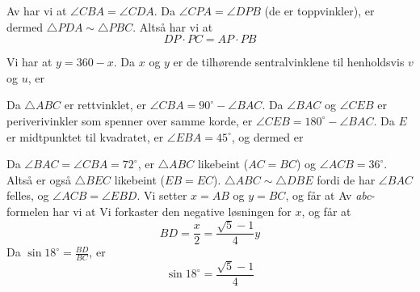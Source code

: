




	\footnotesize
\opgt

Av  har vi at $ \angle CBA=\angle CDA $. Da $ \angle CPA=\angle DPB $ (de er toppvinkler), er dermed $ \triangle PDA \sim \triangle PBC$. Altså har vi at
\[ DP\cdot PC=AP\cdot PB \]

Vi har at $ y=360-x $. Da $ x $ og $ y $ er de tilhørende sentralvinklene til henholdsvis $ v $ og $ u $, er

\newpage
{}
Da $ \triangle ABC $ er rettvinklet, er $ \angle CBA=90^\circ-\angle BAC $. Da $ \angle BAC $ og $ \angle CEB $ er periverivinkler som spenner over samme korde, er $ \angle CEB=180^\circ-\angle BAC $. Da $ E $ er midtpunktet til kvadratet, er $ \angle EBA=45^\circ$, og dermed er

Da $ \angle BAC=\angle CBA=72^\circ $, er $ \triangle ABC $ likebeint ($ AC=BC $) og $ \angle ACB= 36^\circ $. Altså er også $ \triangle BEC $ likebeint ($ EB=EC $). $ \triangle ABC \sim \triangle DBE$ fordi de har $ \angle BAC $ felles, og $ \angle ACB=\angle EBD $. Vi setter $ x=AB $ og $ y=BC $, og får at
Av \textit{abc}-formelen har vi at
Vi forkaster den negative løsningen for $ x $, og får at
\[BD=\frac{x}{2}=\frac{\sqrt{5}-1}{4}y  \]
Da $ \sin 18^\circ=\frac{BD}{BC} $, er
\[ \sin 18^\circ = \frac{\sqrt{5}-1}{4} \]


